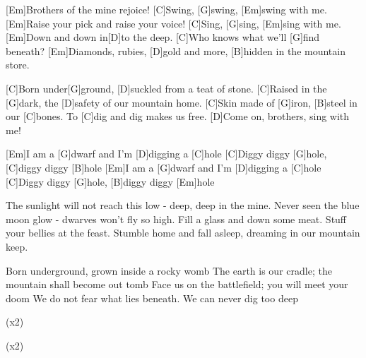 

\begin{guitar}
	[Em]Brothers of the mine rejoice! [C]Swing, [G]swing, [Em]swing with me.
	[Em]Raise your pick and raise your voice! [C]Sing, [G]sing, [Em]sing with me.
	[Em]Down and down in[D]to the deep. [C]Who knows what we'll [G]find beneath?
	[Em]Diamonds, rubies, [D]gold and more, [B]hidden in the mountain store.
	
	[C]Born under[G]ground, [D]suckled from a teat of stone.
	[C]Raised in the [G]dark, the [D]safety of our mountain home.
	[C]Skin made of [G]iron, [B]steel in our [C]bones.
	To [C]dig and dig makes us free. [D]Come on, brothers, sing with me!
	
	[Em]I am a [G]dwarf and I'm [D]digging a [C]hole
	[C]Diggy diggy [G]hole, [C]diggy diggy [B]hole
	[Em]I am a [G]dwarf and I'm [D]digging a [C]hole
	[C]Diggy diggy [G]hole, [B]diggy diggy [Em]hole
	
	The sunlight will not reach this low - deep, deep in the mine.
	Never seen the blue moon glow - dwarves won't fly so high.
	Fill a glass and down some meat. Stuff your bellies at the feast.
	Stumble home and fall asleep, dreaming in our mountain keep.
	
	Born underground, grown inside a rocky womb
	The earth is our cradle; the mountain shall become out tomb
	Face us on the battlefield; you will meet your doom
	We do not fear what lies beneath. We can never dig too deep
	
	  (x2)
	
	 
	
	  (x2)
\end{guitar}